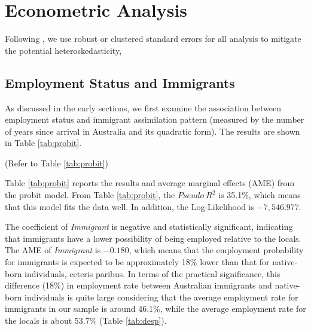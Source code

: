 \section{Econometric Analysis}
\label{sec:Econometric Analysis}

Following \citet[pp. 244--246]{wooldridge2016introductory}, we use robust or clustered standard errors for all analysis to mitigate the potential heteroskedasticity,

\subsection{Employment Status and Immigrants}
\label{sec:Employment Status and Immigrants}

As discussed in the early sections, we first examine the association between employment status and immigrant assimilation pattern (measured by the number of years since arrival in Australia and its quadratic form). The results are shown in Table \ref{tab:probit}.

\begin{center}
(Refer to Table \ref{tab:probit})
\end{center}

Table \ref{tab:probit} reports the results and average marginal effects (AME) from the probit model.
From Table \ref{tab:probit}, the $\mathit{Pseudo\ R^2}$ is 35.1\%, which means that this model fits the data well.
In addition, the Log-Likelihood is $-7,546.977$.

The coefficient of \textit{Immigrant} is negative and statistically significant, indicating that immigrants have a lower possibility of being employed relative to the locals.
The AME of \textit{Immigrant} is $-0.180$, which means that the employment probability for immigrants is expected to be approximately 18\% lower than that for native-born individuals, ceteris paribus.
In terms of the practical significance, this difference (18\%) in employment rate between Australian immigrants and native-born individuals is quite large considering that the average employment rate for immigrants in our sample is around 46.1\%, while the average employment rate for the locals is about 53.7\% (Table \ref{tab:desp}).

